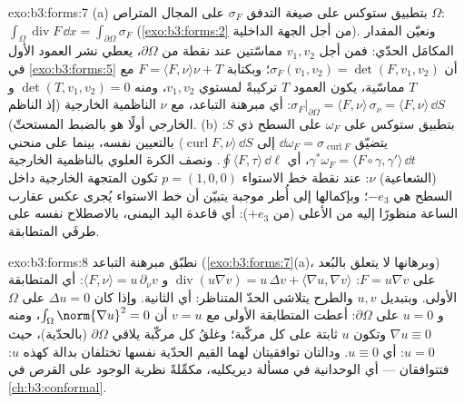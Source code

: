 \begin{solution}{exo:b3:forms:7}
(a) بتطبيق ستوكس على صيغة التدفق $\sigma_F$ على المجال المتراص
$\Omega$: $\int_\Omega\operatorname{div}F\,\dd x =
\int_{\partial\Omega}\sigma_F$ (\cref{exo:b3:forms:2} من أجل الجهة الداخلية). ونعيّن
المقدار المكامَل الحدّي: فمن أجل $v_1, v_2$ مماسّتين عند نقطة
من $\partial\Omega$، يعطي نشر العمود الأول في \cref{exo:b3:forms:5} أن
$\sigma_F(v_1, v_2) = \det(F, v_1, v_2)$؛ وبكتابة $F =
\langle F, \nu\rangle\nu + T$ مع $T$ مماسّية، يكون العمود $T$ تركيبةً
لمستوي $v_1, v_2$، ومنه $\det(T,
v_1, v_2) = 0$ و $\sigma_F\vert_{\partial\Omega} = \langle F,
\nu\rangle\,\sigma_\nu = \langle F, \nu\rangle\,\dd S$: أي مبرهنة التباعد،
مع $\nu$ الناظمية الخارجية (إذ الناظم الخارجي أولًا هو بالضبط
 المستحثّ).
(b) بتطبيق ستوكس على $\omega_F$ على السطح ذي  $S$:
يتضيّق $\dd\omega_F =
\sigma_{\operatorname{curl}F}$ إلى $\langle\operatorname{curl}F, \nu\rangle\,\dd S$ بالتعيين نفسه، بينما على منحني 
$\gamma^*\omega_F = \langle F\circ\gamma,
\gamma'\rangle\,\dd t$، أي $\oint\langle F,
\tau\rangle\,\dd\ell$. ونصف الكرة العلوي بالناظمية الخارجية
(الشعاعية) $\nu$: عند نقطة خط الاستواء $p = (1,0,0)$ تكون
المتجهة الخارجية داخل السطح هي $-e_3$؛ وبإكمالها إلى أُطر موجبة
يتبيّن أن خط الاستواء يُجرى عكس عقارب الساعة منظورًا إليه من
الأعلى (من $+e_3$): أي قاعدة اليد اليمنى، بالاصطلاح نفسه على
طرفَي المتطابقة.
\end{solution}

\begin{solution}{exo:b3:forms:8}
نطبّق مبرهنة التباعد (\cref{exo:b3:forms:7}(a)، وبرهانها لا يتعلق بالبُعد)
على $F = u\nabla v$: $\operatorname{div}(u\nabla v) = u\,\Delta v + \langle\nabla
u, \nabla v\rangle$ و $\langle F, \nu\rangle =
u\,\partial_\nu v$: أي المتطابقة الأولى.
وبتبديل $u, v$ والطرح يتلاشى الحدّ المتناظر: أي الثانية. وإذا
كان $\Delta u = 0$ على $\Omega$ و $u = 0$ على $\partial\Omega$:
أعطت المتطابقة الأولى مع $v = u$ أن $\int_\Omega\norm{\nabla u}^2 = 0$، ومنه $\nabla u \equiv 0$ وتكون
$u$ ثابتة على كل مركّبة؛ وغلقُ كل مركّبة يلاقي $\partial\Omega$
(بالحدّية)، حيث $u = 0$: أي $u \equiv 0$. ودالتان توافقيتان
لهما القيم الحدّية نفسها تختلفان بدالة كهذه $u$: فتتوافقان ---
أي الوحدانية في مسألة ديريكليه، مكمِّلةً نظرية الوجود على
القرص في \cref{ch:b3:conformal}.
\end{solution}

